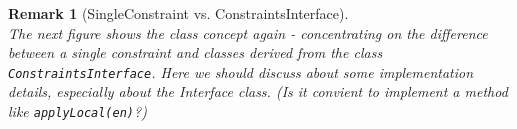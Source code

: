\documentclass[a4paper,11pt]{article}
\numberwithin{equation}{section}
\newtheorem{remark}[definition]{Remark}
\newcommand{\theoremNewline}{\hspace{1mm}\\}
\newcommand{\CodeT}[1]{\textnormal{\texttt{#1}}}
\begin{document}
	\begin{remark}[SingleConstraint vs. ConstraintsInterface]\theoremNewline
		The next figure shows the class concept again - concentrating on the difference between a single constraint and classes derived from the class \CodeT{ConstraintsInterface}. Here we should discuss about some implementation details, especially about the Interface class. (Is it convient to implement a method like \CodeT{applyLocal(en)}?)

\end{remark}
\end{document}
